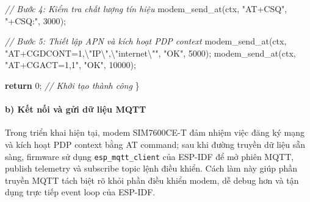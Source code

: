 \documentclass[13pt,a4paper]{extarticle}
\newenvironment{Shaded}{}{}
\newcommand{\CommentTok}[1]{\textcolor[rgb]{0.38,0.63,0.69}{\textit{#1}}}
\newcommand{\ControlFlowTok}[1]{\textcolor[rgb]{0.00,0.44,0.13}{\textbf{#1}}}
\newcommand{\DecValTok}[1]{\textcolor[rgb]{0.25,0.63,0.44}{#1}}
\newcommand{\NormalTok}[1]{#1}
\newcommand{\OperatorTok}[1]{\textcolor[rgb]{0.40,0.40,0.40}{#1}}
\newcommand{\SpecialCharTok}[1]{\textcolor[rgb]{0.25,0.44,0.63}{#1}}
\newcommand{\StringTok}[1]{\textcolor[rgb]{0.25,0.44,0.63}{#1}}
\renewcommand{\\}{\thesislongtableorignewline\hline}%
\begin{document}
\begin{Shaded}
\begin{Highlighting}[]
    \CommentTok{// Bước 4: Kiểm tra chất lượng tín hiệu}
\NormalTok{    modem\_send\_at}\OperatorTok{(}\NormalTok{ctx}\OperatorTok{,} \StringTok{"AT+CSQ"}\OperatorTok{,} \StringTok{"+CSQ:"}\OperatorTok{,} \DecValTok{3000}\OperatorTok{);}

    \CommentTok{// Bước 5: Thiết lập APN và kích hoạt PDP context}
\NormalTok{    modem\_send\_at}\OperatorTok{(}\NormalTok{ctx}\OperatorTok{,} \StringTok{"AT+CGDCONT=1,}\SpecialCharTok{\textbackslash{}"}\StringTok{IP}\SpecialCharTok{\textbackslash{}"}\StringTok{,}\SpecialCharTok{\textbackslash{}"}\StringTok{internet}\SpecialCharTok{\textbackslash{}"}\StringTok{"}\OperatorTok{,} \StringTok{"OK"}\OperatorTok{,} \DecValTok{5000}\OperatorTok{);}
\NormalTok{    modem\_send\_at}\OperatorTok{(}\NormalTok{ctx}\OperatorTok{,} \StringTok{"AT+CGACT=1,1"}\OperatorTok{,} \StringTok{"OK"}\OperatorTok{,} \DecValTok{10000}\OperatorTok{);}

    \ControlFlowTok{return} \DecValTok{0}\OperatorTok{;}  \CommentTok{// Khởi tạo thành công}
\OperatorTok{\}}
\end{Highlighting}
\end{Shaded}

\paragraph{b) Kết nối và gửi dữ liệu
MQTT}\label{b-kux1ebft-nux1ed1i-vuxe0-gux1eedi-dux1eef-liux1ec7u-mqtt}

Trong triển khai hiện tại, modem SIM7600CE-T đảm nhiệm việc đăng ký mạng
và kích hoạt PDP context bằng AT command; sau khi đường truyền dữ liệu
sẵn sàng, firmware sử dụng \texttt{esp\_mqtt\_client} của ESP-IDF để mở
phiên MQTT, publish telemetry và subscribe topic lệnh điều khiển. Cách
làm này giúp phần truyền MQTT tách biệt rõ khỏi phần điều khiển modem,
dễ debug hơn và tận dụng trực tiếp event loop của ESP-IDF.
\end{document}

